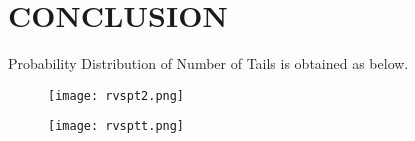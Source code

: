 \documentclass[journal,12pt,twocolumn]{IEEEtran}
\begin{document}
\section{CONCLUSION}

Probability Distribution of Number of Tails is obtained as below.
\newline
\newpage
\begin{figure}[ht]
    \texttt{[image: rvspt2.png]}
 \end{figure} 
\begin{figure}[ht]
    \texttt{[image: rvsptt.png]}
    
\end{figure}
\end{document}
